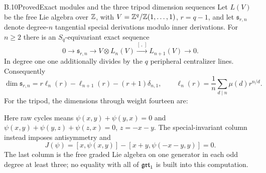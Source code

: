 \begin{statement}{B.10}{Proved}{Exact modules and the three tripod dimension sequences}
Let $L(V)$ be the free Lie algebra over $\mathbb Z$, with
$V=\mathbb Z^q/\mathbb Z(1,\ldots,1)$, $r=q-1$, and let $\mathfrak s_{r,n}$
denote degree-$n$ tangential special derivations modulo inner
derivations. For $n\ge2$ there is an $S_q$-equivariant exact sequence
\[
 0\longrightarrow\mathfrak s_{r,n}
 \longrightarrow V\otimes L_n(V)
 \xrightarrow{[\, ,\, ]}L_{n+1}(V)\longrightarrow0.
\]
In degree one one additionally divides by the $q$ peripheral
centralizer lines. Consequently
\[
 \dim\mathfrak s_{r,n}=r\ell_n(r)-\ell_{n+1}(r)
                    -(r+1)\delta_{n,1},
 \qquad
 \ell_n(r)=\frac1n\sum_{d\mid n}\mu(d)r^{n/d}.
\]
For the tripod, the dimensions through weight fourteen are:

Here raw cycles means
$\psi(x,y)+\psi(y,x)=0$ and
$\psi(x,y)+\psi(y,z)+\psi(z,x)=0$, $z=-x-y$.
The special-invariant column instead imposes antisymmetry and
\[
 J(\psi)=[x,\psi(x,y)]-[x+y,\psi(-x-y,y)]=0.
\]
The last column is the free graded Lie algebra on one generator
in each odd degree at least three; no equality with all of
$\mathfrak{grt}_1$ is built into this computation.
\end{statement}
